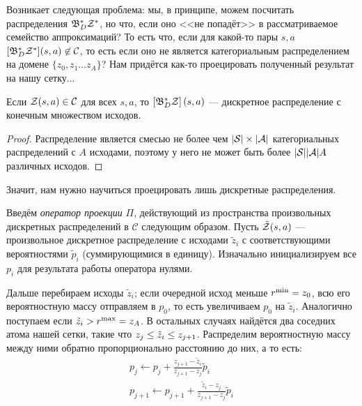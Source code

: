  Возникает следующая проблема: мы, в принципе, можем посчитать распределения $\mathfrak{B}^*_D \mathcal{Z}^*$, но что, если оно <<не попадёт>> в рассматриваемое семейство аппроксимаций? То есть что, если для какой-то пары $s, a$ $[\mathfrak{B}^*_D \mathcal{Z}^*](s, a) \not\in \mathcal{C}$, то есть если оно не является категориальным распределением на домене $\{z_0, z_1 \dots z_A\}$? Нам придётся как-то проецировать полученный результат на нашу сетку...
 
 \begin{proposition}
 Если $\mathcal{Z}(s, a) \in \mathcal{C}$ для всех $s, a$, то $\left[\mathfrak{B}^*_D \mathcal{Z}\right](s, a)$ --- дискретное распределение с конечным множеством исходов.
 \begin{proof} Распределение является смесью не более чем $|\mathcal{S}| \times |\mathcal{A}|$ категориальных распределений с $A$ исходами, поэтому у него не может быть более $|\mathcal{S}| |\mathcal{A}| A$ различных исходов.
 \end{proof}
 \end{proposition}
 
 Значит, нам нужно научиться проецировать лишь дискретные распределения.
 
 \begin{definition}
 Введём \emph{оператор проекции} $\Pi$, действующий из пространства произвольных дискретных распределений в $\mathcal{C}$ следующим образом. Пусть $\tilde{\mathcal{Z}}(s, a)$ --- произвольное дискретное распределение с исходами $\tilde{z}_i$ с соответствующими вероятностями $\tilde{p}_i$ (суммирующимися в единицу). Изначально инициализируем все $p_i$ для результата работы оператора нулями.
 
 Дальше перебираем исходы $\tilde{z}_i$; если очередной исход меньше $r^{\min} \HM= z_0$, всю его вероятностную массу отправляем в $p_0$, то есть увеличиваем $p_0$ на $\tilde{z}_i$. Аналогично поступаем если $\tilde{z}_i \HM> r^{\max} = z_A$. В остальных случаях найдётся два соседних атома нашей сетки, такие что $z_j \HM\le \tilde{z}_i \HM\le z_{j+1}$. Распределим вероятностную массу между ними обратно пропорционально расстоянию до них, а то есть:
\begin{equation}\label{projector}
\begin{split} 
p_j \leftarrow p_j + \frac{z_{j+1} - \tilde{z}_i}{z_{j+1} - z_j} \tilde{p}_i  \\
p_{j+1} \leftarrow p_{j+1} + \frac{\tilde{z}_i - z_j}{z_{j+1} - z_j} \tilde{p}_i
\end{split}
\end{equation}
 \end{definition}

